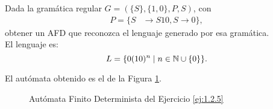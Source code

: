 \begin{ejercicio} \label{ej:1.2.5}
    Dada la gramática regular $G = (\{S\}, \{1, 0\}, P, S)$, con
    \begin{align*}
        P = \{S &\to S10, S \to 0\},
    \end{align*}
    obtener un AFD que reconozca el lenguaje generado por esa gramática.\\

    El lenguaje es:
    \begin{equation*}
        L = \{0(10)^n \mid n\in \mathbb{N}\cup \{0\}\}.
    \end{equation*}

    El autómata obtenido es el de la Figura \ref{fig:ej:1.2.5}.
    \begin{figure}[H]
        \centering
        \caption{Autómata Finito Determinista del Ejercicio \ref{ej:1.2.5}}
        \label{fig:ej:1.2.5}
    \end{figure}
\end{ejercicio}

